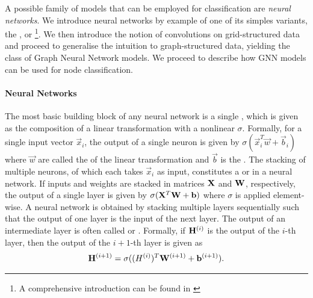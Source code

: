 \documentclass[
	fontsize=10pt, %
	twoside=false, %
	secnumdepth=1, %
  toc=indentunnumbered %
]{kaobook}
\begin{document}

A possible family of models that can be employed for classification are
\textit{neural networks}. We introduce neural networks by example of one of its
simples variants, the , or 
\footnote{A comprehensive introduction can be found in
  \citeauthor{zhang_dive_nodate} \cite{zhang_dive_nodate}
}. We then introduce the notion of convolutions on grid-structured data and
proceed to generalise the intuition to graph-structured data, yielding the class
of Graph Neural Network models. We proceed to describe how GNN models can be
used for node classification.


\paragraph{Neural Networks}

The most basic building block of any neural network is a single
, which is given as the composition of a linear transformation with
a nonlinear  $\sigma$. Formally, for a single input
vector $\vec x_i$, the output of a single neuron is given by $\sigma(\vec x_i^T
\vec w + \vec b_i)$ where $\vec w$ are called the  of the linear
transformation and $\vec b$ is the . The stacking of multiple neurons,
of which each takes $\vec x_i$ as input, constitutes a  or
  in a neural network. If inputs and weights are stacked
in matrices $\mathbf{X}$ and $\mathbf{W}$, respectively, the output of a single layer is
given by $\sigma(\mathbf{X}^T \mathbf{W} + \mathbf{b})$ where $\sigma$ is applied
element-wise.
%
A neural network is obtained by stacking multiple layers sequentially such that
the output of one layer is the input of the next layer. The output of an
intermediate layer is often called  or 
. Formally, if $\mathbf{H}^{(i)}$ is the output of the $i$-th layer,
then the output of the $i+1$-th layer is given as
\begin{align}
\mathbf{H}^{(i+1)} = \sigma(\mathbf{(}H^{(i)})^T \mathbf{W}^{(i+1)} + \mathbf{b}^{(i+1)}).
\label{eq:fully-connected}
\end{align}
%
\end{document}
